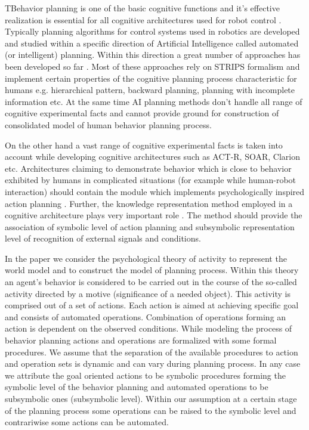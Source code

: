 \documentclass[procedia]{easychair}
\begin{document}
TBehavior planning is one of the basic cognitive functions and it's effective realization is essential for all cognitive architectures used for robot control \cite{Emelyanov2016,Hanford2011,Trafton2013}. Typically planning algorithms for control systems used in robotics are developed and studied within a specific direction of Artificial Intelligence called automated (or intelligent) planning. Within this direction a great number of approaches has been developed so far \cite{DellaPenna2012,Richter2010,Hoffmann2001}. Most of these approaches rely on STRIPS formalism \cite{Fikes1971} and implement certain properties of the cognitive planning process characteristic for humans e.g. hierarchical pattern, backward planning, planning with incomplete information etc. At the same time AI planning methods don't handle all range of cognitive experimental facts and cannot provide ground for construction of consolidated model of human behavior planning process.

On the other hand a vast range of cognitive experimental facts is taken into account while developing cognitive architectures such as ACT-R, SOAR, Clarion etc. Architectures claiming to demonstrate behavior which is close to behavior exhibited by humans in complicated situations (for example while human-robot interaction) should contain the module which implements psychologically inspired action planning \cite{Sun2012a}. Further, the knowledge representation method employed in a cognitive architecture plays very important role \cite{Lieto2014}. The method should provide the association of symbolic level of action planning and subsymbolic representation level of recognition of external signals and conditions.

In the paper we consider the psychological theory of activity \cite{Leontyev2009} to represent the world model and to construct the model of planning process. Within this theory an agent's behavior is considered to be carried out in the course of the so-called activity directed by a motive (significance of a needed object). This activity is comprised out of a set of actions. Each action is aimed at achieving specific goal and consists of automated operations. Combination of operations forming an action is dependent on the observed conditions. While modeling the process of behavior planning actions and operations are formalized with some formal procedures. We assume that the separation of the available procedures to action and operation sets is dynamic and can vary during planning process. In any case we attribute the goal oriented actions to be symbolic procedures forming the symbolic level of the behavior planning and automated operations to be subsymbolic ones (subsymbolic level). Within our assumption at a certain stage of the planning process some operations can be raised to the symbolic level and contrariwise some actions can be automated.
\end{document}
